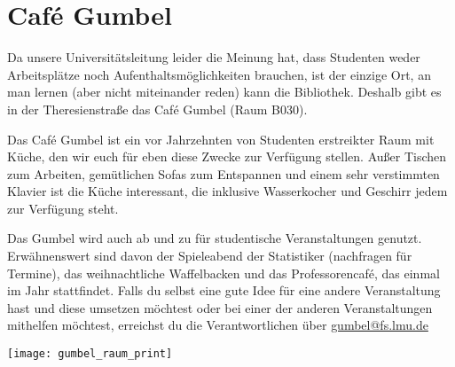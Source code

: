 ﻿
\chapter{Café Gumbel}

Da unsere Universitätsleitung leider die Meinung hat, dass Studenten weder Arbeitsplätze noch Aufenthaltsmöglichkeiten brauchen, ist der einzige Ort, an man lernen (aber nicht miteinander reden) kann die Bibliothek. Deshalb gibt es in der Theresienstraße das Café Gumbel (Raum B030).

Das Café Gumbel ist ein vor Jahrzehnten von Studenten erstreikter Raum mit Küche, den wir euch für eben diese Zwecke zur Verfügung stellen. Außer Tischen zum Arbeiten, gemütlichen Sofas zum Entspannen und einem sehr verstimmten Klavier ist die Küche interessant, die inklusive Wasserkocher und Geschirr jedem zur Verfügung steht.

Das Gumbel wird auch ab und zu für studentische Veranstaltungen genutzt. Erwähnenswert sind davon der Spieleabend der Statistiker (nachfragen für Termine), das weihnachtliche Waffelbacken und das Professorencafé, das einmal im Jahr stattfindet.
Falls du selbst eine gute Idee für eine andere Veranstaltung hast und diese umsetzen möchtest oder bei einer der anderen Veranstaltungen mithelfen möchtest, erreichst du die Verantwortlichen über \url{gumbel@fs.lmu.de}

\skiptobottom
\texttt{[image: gumbel\_raum\_print]}
